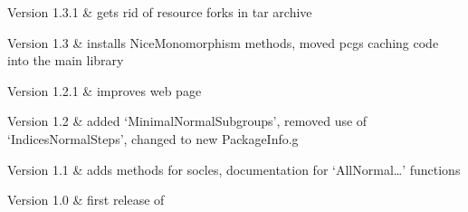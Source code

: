 Version 1.3.1 & 
	gets rid of resource forks in tar archive
	
Version 1.3	&
	installs NiceMonomorphism methods, moved pcgs caching code into the main {\GAP} library
	
Version 1.2.1	&
	improves web page
	
Version 1.2	&
	added `MinimalNormalSubgroups', removed use of `IndicesNormalSteps', changed to new PackageInfo.g 

Version 1.1 	& 
	adds methods for socles, documentation for `AllNormal\dots' functions
	
Version 1.0	&
	first release of {\CRISP}
	
\enditems

